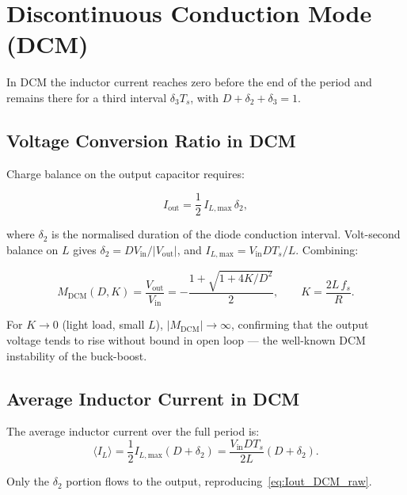 \documentclass[12pt,a4paper]{article}
\newcommand{\Vin}{V_{\mathrm{in}}}
\newcommand{\Vout}{V_{\mathrm{out}}}
\newcommand{\Iout}{I_{\mathrm{out}}}
\newcommand{\ILmax}{I_{L,\mathrm{max}}}
\newcommand{\ILavg}{\langle I_L \rangle}
\newcommand{\Ts}{T_s}
\newcommand{\fs}{f_s}
\begin{document}
\section{Discontinuous Conduction Mode (DCM)}
\label{sec:DCM}

In DCM the inductor current reaches zero before the end of the period and
remains there for a third interval $\delta_3 \Ts$, with
$D + \delta_2 + \delta_3 = 1$.

\subsection{Voltage Conversion Ratio in DCM}

Charge balance on the output capacitor requires:

\begin{equation}
  \Iout = \frac{1}{2}\,\ILmax\,\delta_2,
  \label{eq:Iout_DCM_raw}
\end{equation}

where $\delta_2$ is the normalised duration of the diode conduction
interval.
Volt-second balance on $L$ gives $\delta_2 = D\Vin/|\Vout|$, and
$\ILmax = \Vin D \Ts / L$.
Combining:

\begin{equation}
  M_\mathrm{DCM}(D,K) = \frac{\Vout}{\Vin}
  = -\frac{1 + \sqrt{1 + 4K/D^2}}{2},
  \qquad K = \frac{2L\,\fs}{R}.
  \label{eq:M_DCM}
\end{equation}

For $K \to 0$ (light load, small $L$), $|M_\mathrm{DCM}| \to \infty$,
confirming that the output voltage tends to rise without bound in open
loop — the well-known DCM instability of the buck-boost.

\subsection{Average Inductor Current in DCM}

The average inductor current over the full period is:
\begin{equation}
  \ILavg
  = \frac{1}{2}\ILmax(D + \delta_2)
  = \frac{\Vin D \Ts}{2L}(D + \delta_2).
\end{equation}

Only the $\delta_2$ portion flows to the output, reproducing~\eqref{eq:Iout_DCM_raw}.

\end{document}
